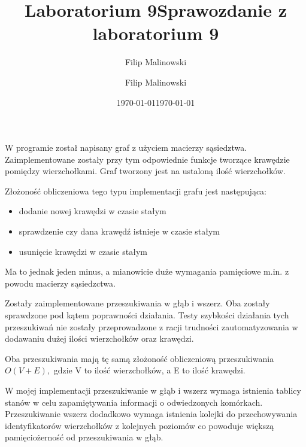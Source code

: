 \documentclass[a4paper,10pt]{scrartcl}
\title{Laboratorium 9}
\author{Filip Malinowski}
\date{\today}
\begin{document}
\title{Sprawozdanie z laboratorium 9}
\author{Filip Malinowski}
\date{\today}

\maketitle

W programie został napisany graf z użyciem
macierzy sąsiedztwa. Zaimplementowane zostały
przy tym odpowiednie funkcje tworzące krawędzie
pomiędzy wierzchołkami. Graf tworzony jest na
ustaloną ilość wierzchołków.

Złożoność obliczeniowa tego typu implementacji
grafu jest następująca:
\begin{itemize}
  \item dodanie nowej krawędzi w czasie stałym
  \item sprawdzenie czy dana krawędź istnieje w czasie stałym
  \item usunięcie krawędzi w czasie stałym
\end{itemize}

Ma to jednak jeden minus, a mianowicie duże wymagania
pamięciowe m.in. z powodu macierzy sąsiedzctwa.

Zostały zaimplementowane przeszukiwania
w głąb i wszerz. Oba zostały sprawdzone pod kątem
poprawności działania. Testy szybkości działania
tych przeszukiwań nie zostały przeprowadzone
z racji trudności zautomatyzowania w dodawaniu
dużej ilości wierzchołków oraz krawędzi.

Oba przeszukiwania mają tę samą złożoność
obliczeniową przeszukiwania
\begin{math}
O(V + E),
\end{math}
gdzie V to ilość wierzchołków, a E to ilość
krawędzi.

W mojej implementacji
przeszukiwanie w głąb i wszerz wymaga istnienia
tablicy stanów w celu zapamiętywania informacji
o odwiedzonych komórkach.
Przeszukiwanie wszerz dodadkowo wymaga istnienia
kolejki do przechowywania identyfikatorów
wierzchołków z kolejnych poziomów
co powoduje większą pamięciożerność
od przeszukiwania w głąb.
\end{document}
